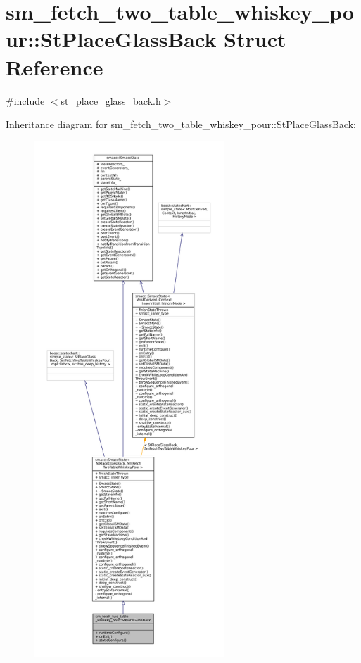 \hypertarget{structsm__fetch__two__table__whiskey__pour_1_1StPlaceGlassBack}{}\section{sm\+\_\+fetch\+\_\+two\+\_\+table\+\_\+whiskey\+\_\+pour\+:\+:St\+Place\+Glass\+Back Struct Reference}
\label{structsm__fetch__two__table__whiskey__pour_1_1StPlaceGlassBack}


{\ttfamily \#include $<$st\+\_\+place\+\_\+glass\+\_\+back.\+h$>$}



Inheritance diagram for sm\+\_\+fetch\+\_\+two\+\_\+table\+\_\+whiskey\+\_\+pour\+:\+:St\+Place\+Glass\+Back\+:
\nopagebreak
\begin{figure}[H]
\begin{center}
\leavevmode
\includegraphics[height=550pt]{structsm__fetch__two__table__whiskey__pour_1_1StPlaceGlassBack__inherit__graph}
\end{center}
\end{figure}


